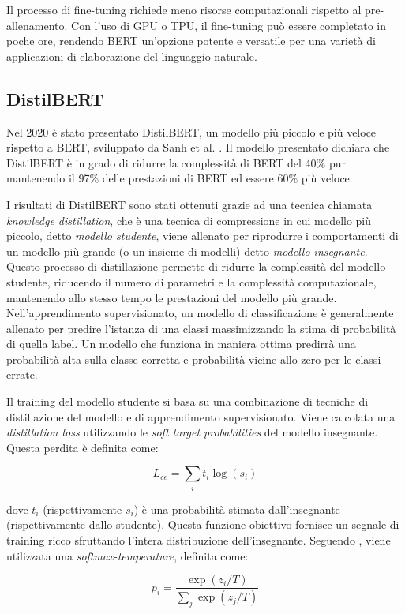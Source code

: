 \documentclass[../../Thesis.tex]{subfiles}
\begin{document}
Il processo di fine-tuning richiede meno risorse computazionali rispetto al pre-allenamento. Con l'uso di GPU o TPU, il fine-tuning può essere completato in poche ore, rendendo BERT un'opzione potente e versatile per una varietà di applicazioni di elaborazione del linguaggio naturale.

\subsection{DistilBERT}
Nel 2020 è stato presentato DistilBERT, un modello più piccolo e più veloce rispetto a BERT, sviluppato da Sanh et al. \cite{DistilBERT}. Il modello presentato dichiara che DistilBERT è in grado di ridurre la complessità di BERT del 40\% pur mantenendo il 97\% delle prestazioni di BERT ed essere 60\% più veloce. 

I risultati di DistilBERT sono stati ottenuti grazie ad una tecnica chiamata \emph{knowledge distillation}, che è una tecnica di compressione in cui modello più piccolo, detto \emph{modello studente}, viene allenato per riprodurre i comportamenti di un modello più grande (o un insieme di modelli) detto \emph{modello insegnante}. Questo processo di distillazione permette di ridurre la complessità del modello studente, riducendo il numero di parametri e la complessità computazionale, mantenendo allo stesso tempo le prestazioni del modello più grande. Nell'apprendimento supervisionato, un modello di classificazione è generalmente allenato per predire l'istanza di una classi massimizzando la stima di probabilità di quella label. Un modello che funziona in maniera ottima predirrà una probabilità alta sulla classe corretta e probabilità vicine allo zero per le classi errate. 

Il training del modello studente si basa su una combinazione di tecniche di distillazione del modello e di apprendimento supervisionato. Viene calcolata una  \textit{distillation loss} utilizzando le \textit{soft target probabilities} del modello insegnante. Questa perdita è definita come:

$$
L_{ce} = \sum_i t_i \log(s_i)
$$

dove $t_i$ (rispettivamente $s_i$) è una probabilità stimata dall'insegnante (rispettivamente dallo studente). Questa funzione obiettivo fornisce un segnale di training ricco sfruttando l'intera distribuzione dell'insegnante. Seguendo \cite{hinton2015distilling}, viene utilizzata una \textit{softmax-temperature}, definita come:

$$
p_i = \frac{\exp(z_i / T)}{\sum_j \exp(z_j / T)}
$$
\end{document}
